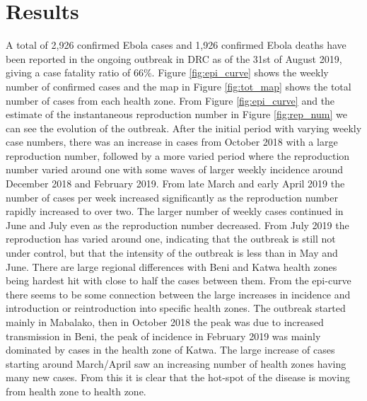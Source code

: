 \documentclass[12pt]{article}
\begin{document}
\section{Results}

A total of 2,926 confirmed Ebola cases and 1,926 confirmed Ebola deaths have been reported in the ongoing outbreak in DRC as of the 31st of August 2019, giving a case fatality ratio of 66\%. Figure \ref{fig:epi_curve} shows the weekly number of confirmed cases and the map in Figure \ref{fig:tot_map} shows the total number of cases from each health zone. From Figure \ref{fig:epi_curve} and the estimate of the instantaneous reproduction number in Figure \ref{fig:rep_num} we can see the evolution of the outbreak. After the initial period with varying weekly case numbers, there was an increase in cases from October 2018 with a large reproduction number, followed by a more varied period where the reproduction number varied around one with some waves of larger weekly incidence around December 2018 and February 2019. From late March and early April 2019 the number of cases per week increased significantly as the reproduction number rapidly increased to over two. The larger number of weekly cases continued in June and July even as the reproduction number decreased. From July 2019 the reproduction has varied around one, indicating that the outbreak is still not under control, but that the intensity of the outbreak is less than in May and June. There are large regional differences with Beni and Katwa health zones being hardest hit with close to half the cases between them. From the epi-curve there seems to be some connection between the large increases in incidence and introduction or reintroduction into specific health zones. The outbreak started mainly in Mabalako, then in October 2018 the peak was due to increased transmission in Beni, the peak of incidence in February 2019 was mainly dominated by cases in the health zone of Katwa. The large increase of cases starting around March/April saw an increasing number of health zones having many new cases. From this it is clear that the hot-spot of the disease is moving from health zone to health zone.
\end{document}
